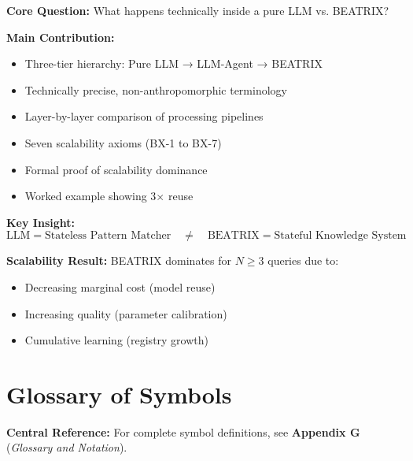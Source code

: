 \begin{tcolorbox}[colback=green!10!white, colframe=green!75!black,
    title=\textbf{Appendix BX: Summary}]

\textbf{Core Question:} What happens technically inside a pure LLM vs. BEATRIX?

\textbf{Main Contribution:}
\begin{itemize}[nosep]
    \item Three-tier hierarchy: Pure LLM → LLM-Agent → BEATRIX
    \item Technically precise, non-anthropomorphic terminology
    \item Layer-by-layer comparison of processing pipelines
    \item Seven scalability axioms (BX-1 to BX-7)
    \item Formal proof of scalability dominance
    \item Worked example showing 3$\times$ reuse
\end{itemize}

\textbf{Key Insight:}
\begin{equation}
\text{LLM} = \text{Stateless Pattern Matcher} \quad \neq \quad \text{BEATRIX} = \text{Stateful Knowledge System}
\end{equation}

\textbf{Scalability Result:} BEATRIX dominates for $N \geq 3$ queries due to:
\begin{itemize}[nosep]
    \item Decreasing marginal cost (model reuse)
    \item Increasing quality (parameter calibration)
    \item Cumulative learning (registry growth)
\end{itemize}

\end{tcolorbox}


\section{Glossary of Symbols}
\label{sec:bx-glossary}

\begin{tcolorbox}[colback=blue!5!white, colframe=blue!75!black]
\textbf{Central Reference:} For complete symbol definitions, see
\textbf{Appendix G} (\textit{Glossary and Notation}).
\end{tcolorbox}

